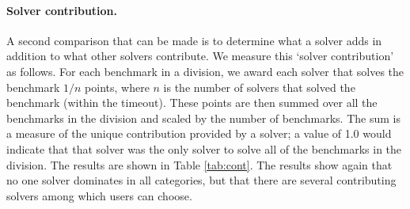 \documentclass[twoside,11pt]{article}
\begin{document}
\paragraph{Solver contribution.} A second comparison that can be made is to determine what a solver adds in addition to 
what other solvers contribute. We measure this `solver contribution' as follows. For each benchmark in a division, we award each solver that solves the benchmark $1/n$ points, where $n$ is the number of solvers that solved the benchmark (within the timeout). These points are then summed over all the benchmarks in the division and scaled by the number of benchmarks. The sum is a measure of the
unique contribution provided by a solver; a value of 1.0 would indicate that that solver was the only solver to solve all of the benchmarks in the division. The results are shown in Table \ref{tab:cont}. The results show again that no one solver dominates in all categories, but that there are several contributing solvers among which users can choose.
\end{document}
